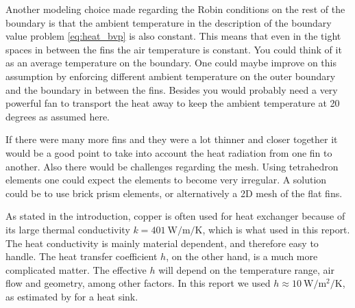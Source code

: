 Another modeling choice made regarding the Robin conditions on the rest of the boundary is that the ambient temperature in the description of the boundary value problem \cref{eq:heat_bvp} is also constant. This means that even in the tight spaces in between the fins the air temperature is constant. You could think of it as an average temperature on the boundary. One could maybe improve on this assumption by enforcing different ambient temperature on the outer boundary and the boundary in between the fins. Besides you would probably need a very powerful fan to transport the heat away to keep the ambient temperature at 20 degrees as assumed here.

If there were many more fins and they were a lot thinner and closer together it would be a good point to take into account the heat radiation from one fin to another. Also there would be challenges regarding the mesh. Using tetrahedron elements one could expect the elements to become very irregular. A solution could be to use brick prism elements, or alternatively a 2D mesh of the flat fins.

As stated in the introduction, copper is often used for heat exchanger because of its large thermal conductivity $k = \SI{401}{\watt\per\meter\per\kelvin}$, which is what used in this report. The heat conductivity is mainly material dependent, and therefore easy to handle. The heat transfer coefficient $h$, on the other hand, is a much more complicated matter. The effective $h$ will depend on the temperature range, air flow and geometry, among other factors. In this report we used $h \approx \SI{10}{\watt\per\meter\squared\per\kelvin}$, as estimated by \cite{heat_transfer_coeff} for a heat sink.